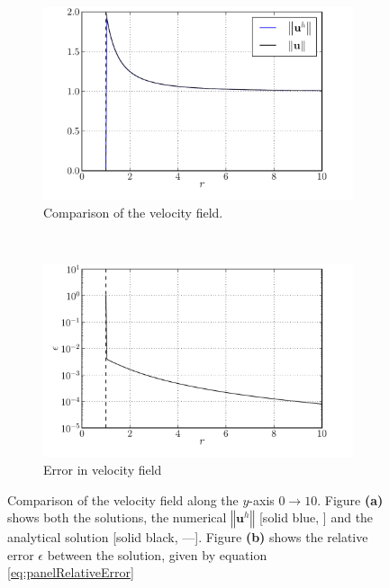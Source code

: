 \begin{figure}[!b]
        \centering
        \begin{subfigure}[b]{0.5\textwidth}
                \includegraphics[width=\textwidth]{figures/lagrangian/panelCylinder_versusAnalytical.pdf}
                \caption{Comparison of the velocity field.}
                \label{fig:panelCylinder_versusAnalytical}
        \end{subfigure}%
        ~ %
        \begin{subfigure}[b]{0.5\textwidth}
                \includegraphics[width=\textwidth]{figures/lagrangian/panelCylinder_error.pdf}
                \caption{Error in velocity field}
                \label{fig:panelCylinder_error}
        \end{subfigure}
        \caption{Comparison of the velocity field along the $y$-axis $0\rightarrow10$. Figure \textbf{(a)} shows both the solutions, the numerical $\left\Vert\mathbf{u}^h\right\Vert$ [solid blue, {\color{plotBlue}{---}}] and the analytical solution [solid black, ---]. Figure \textbf{(b)} shows the relative error $\epsilon$ between the solution, given by equation \ref{eq:panelRelativeError}}
        \label{fig:panelCylinderComparision}
\end{figure}	

